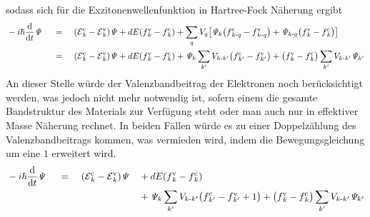 \documentclass[a4paper,11pt]{article}
\newcommand{\ind}[2]{{_{#1}^{#2}}}
\newcommand{\+}{\dagger}
\newcommand{\E}{\mathcal{E}}
\newcommand{\dt}[1]{\frac{\tt d #1}{\tt d t}}
\renewcommand{\^}{\hat}
\renewcommand{\tt}{\text}
\renewcommand{\~}{\widetilde}
\begin{document}
sodass sich für die Exzitonenwellenfunktion in Hartree-Fock Näherung ergibt
\begin{alignat*}{3}
& -i\hbar\dt{} \mathit{\Psi} && \ =\ && (\E \ind{k}{\tt c}-\E \ind{k}{\tt v})\mathit{\Psi}+dE(f\ind{k}{\tt v}-f\ind{k}{\tt c})  + \sum_{q} V_q\big[ \mathit{\Psi}_{k}\big(f\ind{k\tt-q}{\tt c}-f\ind{k\tt-q}{\tt v}\big) +\mathit{\Psi}_{k\tt-q}\big(f\ind{k}{\tt v}-f\ind{k}{\tt c}\big)\big] \\
& && \ =\ && (\E \ind{k}{\tt c}-\E \ind{k}{\tt v})\mathit{\Psi}+dE(f\ind{k}{\tt v}-f\ind{k}{\tt c})  + \mathit{\Psi}_{k}\sum_{k'} V_{k\tt -k'}\big(f\ind{k'}{\tt c}-f\ind{k'}{\tt v}\big) +\big(f\ind{k}{\tt v}-f\ind{k}{\tt c}\big)\sum_{k'} V_{k\tt-k'}\mathit{\Psi}_{k'} \\	
\end{alignat*}
An dieser Stelle würde der Valenzbandbeitrag der Elektronen noch berücksichtigt werden, was jedoch nicht mehr notwendig ist, sofern einem die gesamte Bandstruktur des Materials zur Verfügung steht oder man auch nur in effektiver Masse Näherung rechnet. In beiden Fällen würde es zu einer Doppelzählung des Valenzbandbeitrags kommen, was vermieden wird, indem die Bewegungsgleichung um eine $1$ erweitert wird. 
\begin{alignat*}{4}
& -i\hbar\dt{}\mathit{\Psi} && \ =\ && (\E \ind{k}{\tt c}-\E \ind{k}{\tt v})\mathit{\Psi}&& +dE(f\ind{k}{\tt v}-f\ind{k}{\tt c}) \\
& && && && + \mathit{\Psi}_{k}\sum_{k'} V_{k\tt -k'}\big(f\ind{k'}{\tt c}-f\ind{k'}{\tt v}+1\big) +\big(f\ind{k}{\tt v}-f\ind{k}{\tt c}\big)\sum_{k'} V_{k\tt-k'}\mathit{\Psi}_{k'} 
\end{alignat*}
\end{document}
